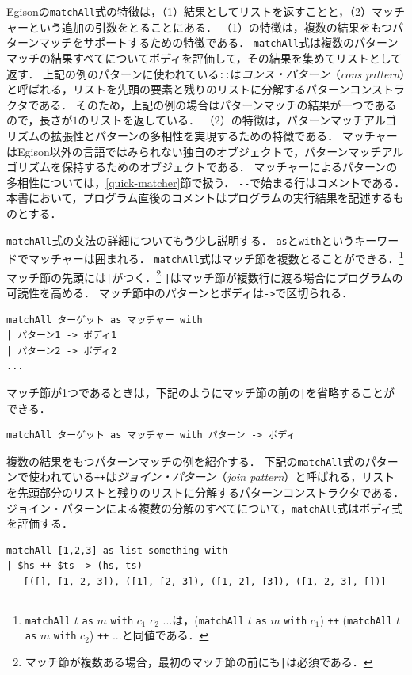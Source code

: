 Egisonの\lstinline{matchAll}式の特徴は，（1）結果としてリストを返すことと，（2）マッチャーという追加の引数をとることにある．
（1）の特徴は，複数の結果をもつパターンマッチをサポートするための特徴である．
\lstinline{matchAll}式は複数のパターンマッチの結果すべてについてボディを評価して，その結果を集めてリストとして返す．
上記の例のパターンに使われている\lstinline{::}は\emph{コンス・パターン}（\emph{cons pattern}）と呼ばれる，リストを先頭の要素と残りのリストに分解するパターンコンストラクタである．
そのため，上記の例の場合はパターンマッチの結果が一つであるので，長さが$1$のリストを返している．
（2）の特徴は，パターンマッチアルゴリズムの拡張性とパターンの多相性を実現するための特徴である．
マッチャーはEgison以外の言語ではみられない独自のオブジェクトで，パターンマッチアルゴリズムを保持するためのオブジェクトである．
マッチャーによるパターンの多相性については，\ref{quick-matcher}節で扱う．
\lstinline{--}で始まる行はコメントである．
本書において，プログラム直後のコメントはプログラムの実行結果を記述するものとする．

\lstinline{matchAll}式の文法の詳細についてもう少し説明する．
\lstinline{as}と\lstinline{with}というキーワードでマッチャーは囲まれる．
\lstinline{matchAll}式はマッチ節を複数とることができる．\footnote{\lstinline{matchAll} $t$ \lstinline{as} $m$ \lstinline{with} $c_1$ $c_2$ $...$は，(\lstinline{matchAll} $t$ \lstinline{as} $m$ \lstinline{with} $c_1$) \lstinline{++} (\lstinline{matchAll} $t$ \lstinline{as} $m$ \lstinline{with} $c_2$) \lstinline{++} $...$と同値である．}
マッチ節の先頭には\lstinline{|}がつく．\footnote{マッチ節が複数ある場合，最初のマッチ節の前にも\lstinline{|}は必須である．}
\lstinline{|}はマッチ節が複数行に渡る場合にプログラムの可読性を高める．
マッチ節中のパターンとボディは\lstinline{->}で区切られる．
\begin{lstlisting}[language=egison,numbers=none]
matchAll ターゲット as マッチャー with
| パターン1 -> ボディ1
| パターン2 -> ボディ2
...
\end{lstlisting}
マッチ節が1つであるときは，下記のようにマッチ節の前の\lstinline{|}を省略することができる．
\begin{lstlisting}[language=egison,numbers=none]
matchAll ターゲット as マッチャー with パターン -> ボディ
\end{lstlisting}

複数の結果をもつパターンマッチの例を紹介する．
下記の\lstinline{matchAll}式のパターンで使われている\lstinline{++}は\emph{ジョイン・パターン}（\emph{join pattern}）と呼ばれる，リストを先頭部分のリストと残りのリストに分解するパターンコンストラクタである．
ジョイン・パターンによる複数の分解のすべてについて，\lstinline{matchAll}式はボディ式を評価する．
\begin{lstlisting}[language=egison,numbers=none]
matchAll [1,2,3] as list something with
| $hs ++ $ts -> (hs, ts)
-- [([], [1, 2, 3]), ([1], [2, 3]), ([1, 2], [3]), ([1, 2, 3], [])]
\end{lstlisting}

